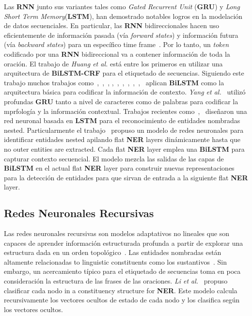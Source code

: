 Las \textbf{RNN} junto sus variantes tales como \emph{Gated Recurrent Unit} (\textbf{GRU}) y \emph{Long Short Term Memory}(\textbf{LSTM}), han demostrado notables logros en la modelaci\'on de datos secuenciales. En particular, las \textbf{RNN} bidireccionales hacen uso eficientemente de informaci\'on pasada (v\'ia \emph{forward states}) y informaci\'on futura (v\'ia \emph{backward states}) para un espec\'ifico time frame~\cite{huang2015bidirectional}. Por lo tanto, un \emph{token} codificado por una \textbf{RNN} bidireccional va a contener informaci\'on de toda la oraci\'on. El trabajo de \emph{Huang et al.}\cite{huang2015bidirectional} est\'a entre los primeros en utilizar una arquitectura de \textbf{BiLSTM-CRF} para el etiquetado de secuencias. Siguiendo este trabajo muchos trabajos como~\cite{lample2016neural},~\cite{chiu2016named},~\cite{nguyen2016toward},
\cite{zhai2017neural},~\cite{zhou2017joint},~\cite{ma2016end},~\cite{tran2017named},~\cite{rei2016attending},~\cite{wei2016disease},~\cite{lin2017multi} aplican \textbf{BiLSTM} como la arquitectura b\'asica para codificar la informaci\'on de contexto. \emph{Yang et al.}~\cite{yang2016multi} utiliz\'o profundas \textbf{GRU} tanto a nivel de caracteres como de palabras para codificar la mprfolog\'ia y la informaci\'on contextual. Trabajos recientes como~\cite{katiyar2018nested},~\cite{ju2018neural} dise\~naron una red neuronal basada en \textbf{LSTM} para el reconocimiento de entidades nombradas nested. Particularmente el trabajo~\cite{ju2018neural} propuso un modelo de redes neuronales para identificar entidades nested apilando flat \textbf{NER} layers din\'amicamente hasta que no outer entities are extracted. Cada flat \textbf{NER} layer emplea una \textbf{BiLSTM} para capturar contexto secuencial. El modelo mezcla las salidas de las capas de \textbf{BiLSTM} en el actual flat \textbf{NER} layer para construir nuevas representaciones para la detecci\'on de entidades para que sirvan de entrada a la siguiente flat \textbf{NER} layer.

\subsection{Redes Neuronales Recursivas}

Las redes neuronales recursivas son modelos adaptativos no lineales que son capaces de aprender informaci\'on estructurada profunda a partir de explorar una estructura dada en un orden topol\'ogico~\cite{li2018survey}. Las entidades nombradas est\'an altamente relacionadas to linguistic constituents como los sustantivos~\cite{li2017leveraging}. Sin embargo, un acercamiento t\'ipico para el etiquetado de secuencias toma en poca consideraci\'on la estructura de las frases de las oraciones. \emph{Li et al.}~\cite{li2017leveraging} propuso clasificar cada nodo in a constituency structure for \textbf{NER}. Este modelo calcula recursivamente los vectores ocultos de estado de cada nodo y los clasifica seg\'un los vectores ocultos.

